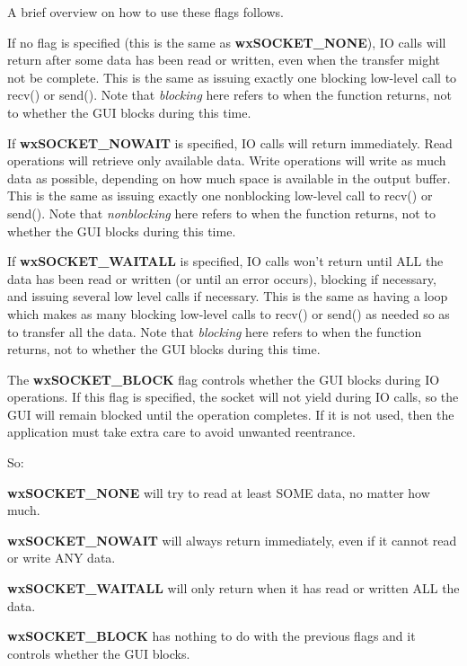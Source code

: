 A brief overview on how to use these flags follows.

If no flag is specified (this is the same as {\bf wxSOCKET\_NONE}),
IO calls will return after some data has been read or written, even
when the transfer might not be complete. This is the same as issuing
exactly one blocking low-level call to recv() or send(). Note that
{\it blocking} here refers to when the function returns, not to whether
the GUI blocks during this time.

If {\bf wxSOCKET\_NOWAIT} is specified, IO calls will return immediately.
Read operations will retrieve only available data. Write operations will
write as much data as possible, depending on how much space is available
in the output buffer. This is the same as issuing exactly one nonblocking
low-level call to recv() or send(). Note that {\it nonblocking} here
refers to when the function returns, not to whether the GUI blocks during
this time.

If {\bf wxSOCKET\_WAITALL} is specified, IO calls won't return until ALL
the data has been read or written (or until an error occurs), blocking if
necessary, and issuing several low level calls if necessary. This is the
same as having a loop which makes as many blocking low-level calls to
recv() or send() as needed so as to transfer all the data. Note that
{\it blocking} here refers to when the function returns, not to whether
the GUI blocks during this time.

The {\bf wxSOCKET\_BLOCK} flag controls whether the GUI blocks during
IO operations. If this flag is specified, the socket will not yield
during IO calls, so the GUI will remain blocked until the operation
completes. If it is not used, then the application must take extra
care to avoid unwanted reentrance.

So:

{\bf wxSOCKET\_NONE} will try to read at least SOME data, no matter how much.

{\bf wxSOCKET\_NOWAIT} will always return immediately, even if it cannot
read or write ANY data.

{\bf wxSOCKET\_WAITALL} will only return when it has read or written ALL
the data.

{\bf wxSOCKET\_BLOCK} has nothing to do with the previous flags and
it controls whether the GUI blocks.

%
%
\label{wxsocketbasesetnotify}


